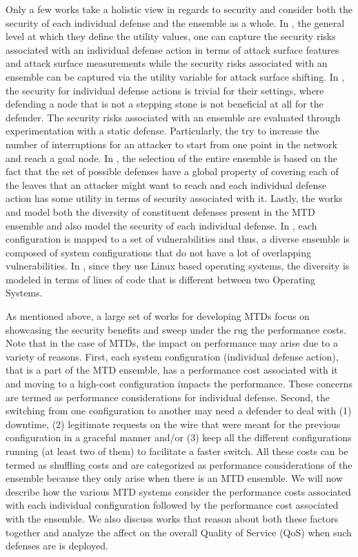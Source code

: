 Only a few works take a holistic view in regards to security and consider both the security of each individual defense and the ensemble as a whole. In , the general level at which they define the {utility values}, one can capture the security risks associated with an {individual defense} action in terms of {attack surface features} and {attack surface measurements} while the security risks associated with an ensemble can be captured via the utility variable for attack surface shifting. In , the security for individual defense actions is trivial for their settings, where defending a node that is not a stepping stone is not beneficial at all for the defender. The security risks associated with an ensemble are evaluated through experimentation with a static defense.  Particularly, the try to increase the number of interruptions for an attacker to start from one point in the network and reach a goal node. In , the selection of the {entire ensemble} is based on the fact that the set of {possible defenses} have a {global property} of {covering} each of the {leaves} that an attacker might want to reach and each individual defense action has some utility in terms of security associated with it. Lastly, the works  and  model both the {diversity} of {constituent defenses} present in the MTD ensemble and also model the security of each individual defense. In , each {configuration} is mapped to a set of {vulnerabilities} and thus, a diverse ensemble is composed of system configurations that do not have a lot of overlapping vulnerabilities. In , since they use Linux based operating systems, the diversity is modeled in terms of lines of code that is {different} between two {Operating Systems}.

As mentioned above, a large set of works for developing MTDs focus on showcasing the security benefits and sweep under the rug the performance costs. Note that in the case of MTDs, the impact on performance may arise due to a variety of reasons. First, each system configuration (individual defense action), that is a part of the MTD ensemble, has a performance cost associated with it and moving to a high-cost configuration {impacts} the performance. These concerns are termed as performance considerations for individual defense. Second, the switching from one configuration to another may need a defender to deal with (1) downtime, (2) legitimate requests on the wire that were meant for the previous configuration in a graceful manner and/or (3) keep all the different configurations running (at least two of them) to facilitate a faster switch. All these costs can be termed as shuffling costs and are categorized as performance considerations of the ensemble because they only arise when there is an MTD ensemble.
We will now describe how the various MTD systems consider the performance costs associated with each individual configuration followed by the performance cost associated with the ensemble. We also discuss works that reason about both these factors together and analyze the affect on the overall {Quality of Service} (QoS) when such defenses are is deployed.

